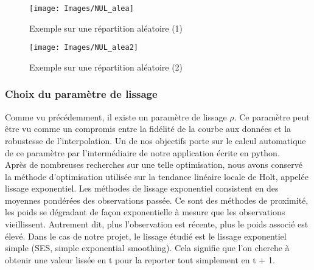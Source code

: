 \documentclass[a4paper,12pt]{article} %
\begin{document}
                \begin{figure}[H]
                \begin{center}
                \texttt{[image: Images/NUL\_alea]} 
                \end{center}
                \caption{Exemple sur une répartition aléatoire (1)}
                \label{NUL3}
                \end{figure}
                
                
                \begin{figure}[H]
                \begin{center}
                \texttt{[image: Images/NUL\_alea2]} 
                \end{center}
                \caption{Exemple sur une répartition aléatoire (2)}
                \label{NUL4}
                \end{figure}
                

			\subsubsection{Choix du paramètre de lissage}
                Comme vu précédemment, il existe un paramètre de lissage $\rho$. Ce paramètre peut être vu comme un compromis entre la fidélité de la courbe aux données et la robustesse de l'interpolation. Un de nos objectifs porte sur le calcul automatique de ce paramètre par l'intermédiaire de notre application écrite en python.\\
                
                Après de nombreuses recherches sur une telle optimisation, nous avons conservé la méthode d'optimisation utilisée sur la tendance linéaire locale de Holt, appelée lissage exponentiel. 
                Les méthodes de lissage exponentiel consistent en des moyennes pondérées des observations passée. Ce sont des méthodes de proximité, les poids se dégradant de façon exponentielle à mesure que les observations vieillissent. Autrement dit, plus l’observation est récente, plus le poids associé est élevé. 
                Dans le cas de notre projet, le lissage étudié est le lissage exponentiel simple (SES, simple exponential smoothing). Cela signifie que l'on cherche à obtenir une valeur lissée en t pour la reporter tout simplement en t + 1.
                
\end{document}
